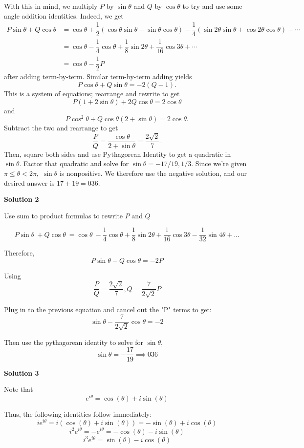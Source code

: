 \begin{enumerate}
 With this in mind, we multiply $P$ by $\sin \theta$ and $Q$ by $\cos \theta$ to try and use some angle addition identities. Indeed, we get 
 \begin{align*} P \sin \theta + Q \cos \theta &= \cos \theta + \dfrac{1}{2}(\cos \theta \sin \theta - \sin \theta \cos \theta) - \dfrac{1}{4}(\sin{2 \theta} \sin \theta + \cos{2 \theta} \cos{\theta}) - \cdots \\ &= \cos \theta - \dfrac{1}{4} \cos \theta + \dfrac{1}{8} \sin{2 \theta} + \dfrac{1}{16} \cos{3 \theta} + \cdots \\ &= \cos \theta - \dfrac{1}{2}P \end{align*}
after adding term-by-term. Similar term-by-term adding yields 
 \[P \cos \theta + Q \sin \theta = -2(Q - 1).\] This is a system of equations; rearrange and rewrite to get 
 \[P(1 + 2 \sin \theta) + 2Q \cos \theta = 2 \cos \theta\] and 
 \[P \cos^2 \theta + Q \cos \theta(2 + \sin \theta) = 2 \cos \theta.\] Subtract the two and rearrange to get 
 \[\dfrac{P}{Q} = \dfrac{\cos \theta}{2 + \sin \theta} = \dfrac{2 \sqrt{2}}{7}.\] Then, square both sides and use Pythagorean Identity to get a quadratic in $\sin \theta.$ Factor that quadratic and solve for $\sin \theta = -17/19, 1/3.$ Since we're given $\pi\leq\theta<2\pi,$ $\sin\theta$ is nonpositive. We therefore use the negative solution, and our desired answer is $17 + 19 = \boxed{036}.$




\textbf{Solution 2}

Use sum to product formulas to rewrite $P$ and $Q$

 \[P \sin\theta\ + Q \cos\theta\ = \cos \theta\ - \frac{1}{4}\cos \theta + \frac{1}{8}\sin 2\theta + \frac{1}{16}\cos 3\theta - \frac{1}{32}\sin 4\theta + ...\]

 Therefore, 
 \[P \sin \theta - Q \cos \theta = -2P\]

 Using 
 \[\frac{P}{Q} =  \frac{2\sqrt2}{7}, Q = \frac{7}{2\sqrt2} P\]

 Plug in to the previous equation and cancel out the "P" terms to get: 
 \[\sin\theta - \frac{7}{2\sqrt2} \cos\theta = -2\]

 Then use the pythagorean identity to solve for $\sin\theta$, 
 \[\sin\theta = -\frac{17}{19} \implies \boxed{036}\]




\textbf{Solution 3}

Note that 
 \[e^{i\theta}=\cos(\theta)+i\sin(\theta)\]

 Thus, the following identities follow immediately:
 \[ie^{i\theta}=i(\cos(\theta)+i\sin(\theta))=-\sin(\theta)+i\cos(\theta)\]
 \[i^2 e^{i\theta}=-e^{i\theta}=-\cos(\theta)-i\sin(\theta)\]
 \[i^3 e^{i\theta}=\sin(\theta)-i\cos(\theta)\]


\end{enumerate}
